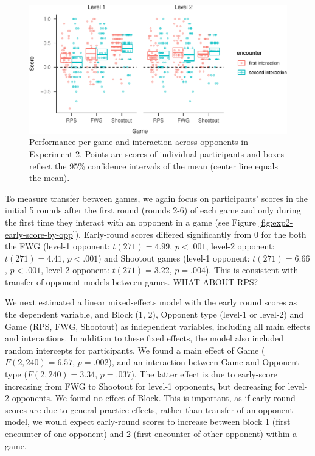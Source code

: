 \documentclass[smallextended]{svjour3}       %
\begin{document}
\begin{figure}

{\centering \includegraphics[width=\textwidth]{CBB_v2_files/figure-latex/exp2-score-by-opp-1} 

}

\caption{\label{fig:exp2-score-by-opp}Performance per game and interaction across opponents in Experiment 2. Points are scores of individual participants and boxes reflect the 95\% confidence intervals of the mean (center line equals the mean).}\label{fig:exp2-score-by-opp}
\end{figure}

To measure transfer between games, we again focus on participants'
scores in the initial 5 rounds after the first round (rounds 2-6) of
each game and only during the first time they interact with an opponent
in a game (see Figure \ref{fig:exp2-early-score-by-opp}). Early-round
scores differed significantly from 0 for the both the FWG (level-1
opponent: \(t(271) = 4.99\), \(p < .001\), level-2 opponent:
\(t(271) = 4.41\), \(p < .001\)) and Shootout games (level-1 opponent:
\(t(271) = 6.66\), \(p < .001\), level-2 opponent: \(t(271) = 3.22\),
\(p = .004\)). This is consistent with transfer of opponent models
between games. WHAT ABOUT RPS?

We next estimated a linear mixed-effects model with the early round
scores as the dependent variable, and Block (1, 2), Opponent type
(level-1 or level-2) and Game (RPS, FWG, Shootout) as independent
variables, including all main effects and interactions. In addition to
these fixed effects, the model also included random intercepts for
participants. We found a main effect of Game (\(F(2,240) = 6.57\),
\(p = .002\)), and an interaction between Game and Opponent type
(\(F(2,240) = 3.34\), \(p = .037\)). The latter effect is due to
early-score increasing from FWG to Shootout for level-1 opponents, but
decreasing for level-2 opponents. We found no effect of Block. This is
important, as if early-round scores are due to general practice effects,
rather than transfer of an opponent model, we would expect early-round
scores to increase between block 1 (first encounter of one opponent) and
2 (first encounter of other opponent) within a game.
\end{document}
